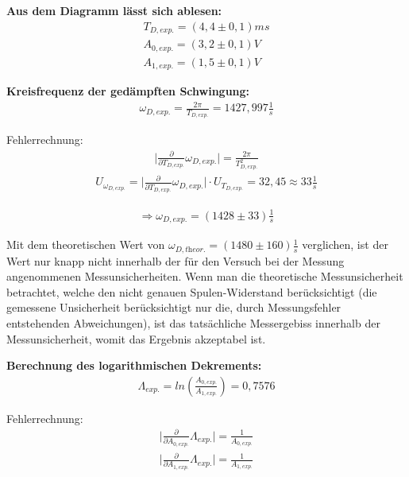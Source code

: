 \documentclass[a4paper]{scrartcl}
\numberwithin{equation}{subsection}
\begin{document}
\textbf{Aus dem Diagramm lässt sich ablesen:}
\begin{align*}
T_{D,\textit{exp.}} = (4,4\pm0,1)ms \\
A_{0,\textit{exp.}} = (3,2\pm0,1)V \\
A_{1,\textit{exp.}} = (1,5\pm0,1)V
\end{align*}

\textbf{Kreisfrequenz der gedämpften Schwingung:}
\begin{align}
\omega_{D,\textit{exp.}} = \frac{2\pi}{T_{D,\textit{exp.}}} = 1427,997 \frac{1}{s}
\end{align}

Fehlerrechnung:
\begin{align*}
\vert \frac{\partial}{\partial T_{D,\textit{exp.}}}\omega_{D,\textit{exp.}}\vert = \frac{2\pi}{T_{D,\textit{exp.}}^2}
\end{align*}
\begin{align*}
U_{\omega_{D,\textit{exp.}}} = \vert \frac{\partial}{\partial T_{D,\textit{exp.}}}\omega_{D,\textit{exp.}}\vert \cdot U_{T_{D,\textit{exp.}}} = 32,45 \approx 33 \frac{1}{s} 
\end{align*}

\begin{align*}
\Rightarrow \omega_{D,\textit{exp.}} = (1428 \pm 33) \frac{1}{s}
\end{align*}

Mit dem theoretischen Wert von $\omega_{D,\textit{theor.}} = (1480\pm160) \frac{1}{s}$ verglichen, ist der Wert nur knapp nicht innerhalb der für den Versuch bei der Messung angenommenen Messunsicherheiten. Wenn man die theoretische Messunsicherheit betrachtet, welche den nicht genauen Spulen-Widerstand berücksichtigt (die gemessene Unsicherheit berücksichtigt nur die, durch Messungsfehler entstehenden Abweichungen), ist das tatsächliche Messergebiss innerhalb der Messunsicherheit, womit das Ergebnis akzeptabel ist.

\textbf{Berechnung des logarithmischen Dekrements:}
\begin{align}
\Lambda_{\textit{exp.}} = ln(\frac{A_{0,\textit{exp.}}}{A_{1,\textit{exp.}}}) = 0,7576
\end{align}

Fehlerrechnung:
\begin{align*}
\vert \frac{\partial}{\partial A_{0,\textit{exp.}}}\Lambda_{\textit{exp.}}\vert = \frac{1}{A_{0,\textit{exp.}}} \\
\vert \frac{\partial}{\partial A_{1,\textit{exp.}}}\Lambda_{\textit{exp.}}\vert = \frac{1}{A_{1,\textit{exp.}}}
\end{align*}
\end{document}
